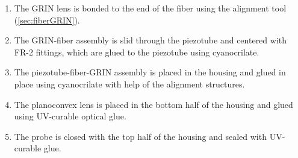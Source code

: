 \begin{enumerate}
\item The GRIN lens is bonded to the end of the fiber using the alignment tool (\autoref{sec:fiberGRIN}).
\item The GRIN-fiber assembly is slid through the piezotube and centered with FR-2 fittings, which are glued to the piezotube using cyanocrilate.
\item The piezotube-fiber-GRIN assembly is placed in the housing and glued in place using cyanocrilate with help of the alignment structures.
\item The planoconvex lens is placed in the bottom half of the housing and glued using UV-curable optical glue.
\item The probe is closed with the top half of the housing and sealed with UV-curable glue.
\end{enumerate}

